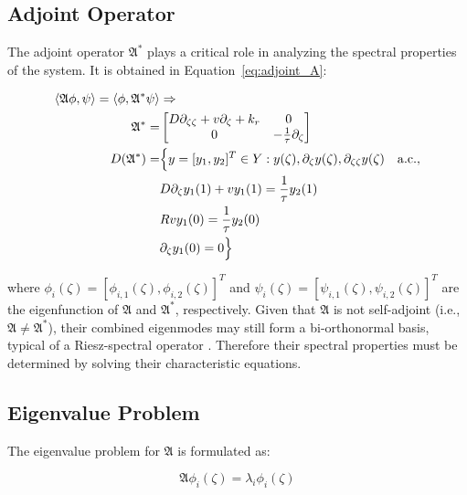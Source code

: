 \subsection{Adjoint Operator}

The adjoint operator $\mathfrak{A}^*$ plays a critical role in analyzing the spectral properties of the system. It is obtained in Equation~\ref{eq:adjoint_A}:

\begin{equation} \label{eq:adjoint_A}
    \begin{aligned}
        \langle \mathfrak{A} \phi, \psi\rangle  = \langle \phi, {\mathfrak{A}}^{*} \psi\rangle  &\Rightarrow \\
        {\mathfrak{A}}^{*} =&
        \begin{bmatrix}
            D \partial_{\zeta \zeta} + v \partial_\zeta +k_r & 0\\
            0 & -\frac{1}{\tau} \partial_\zeta
        \end{bmatrix}\\
        D(\mathfrak{A}^*) =& \Bigl\{ y = [y_1, y_2]^T \in Y:
        y(\zeta), \partial_\zeta y(\zeta), \partial_{\zeta \zeta} y(\zeta) \quad \mathrm{a.c.},\\
        &D \partial_\zeta y_1(1) + v y_1(1) = \frac{1}{\tau} y_2(1) \\
        &R v y_1(0) = \frac{1}{\tau} y_2(0) \\
        &\partial_\zeta y_1(0) = 0 \Bigr\}
    \end{aligned}
\end{equation}

where $\phi_i(\zeta) = [\phi_{i,1}(\zeta), \phi_{i,2}(\zeta)]^T$ and $\psi_i(\zeta) = [\psi_{i,1}(\zeta), \psi_{i,2}(\zeta)]^T$ are the eigenfunction of $\mathfrak{A}$ and $\mathfrak{A}^*$, respectively. Given that $\mathfrak{A}$ is not self-adjoint (i.e., $\mathfrak{A} \neq \mathfrak{A}^*$), their combined eigenmodes may still form a bi-orthonormal basis, typical of a Riesz-spectral operator \autocite{curtainbook}. Therefore their spectral properties must be determined by solving their characteristic equations.

\subsection{Eigenvalue Problem}

The eigenvalue problem\autocite{pdebook} for $\mathfrak{A}$ is formulated as:

\begin{equation} \label{eq:eig_prob}
        \mathfrak{A} \phi_i(\zeta) = \lambda_i \phi_i(\zeta)
\end{equation}

